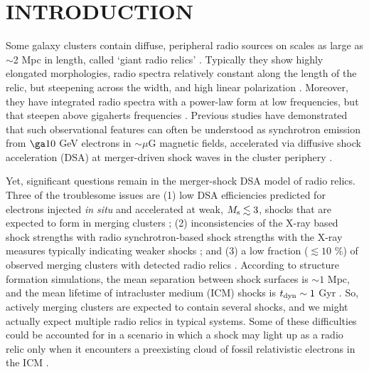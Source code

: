 \documentclass[twocolumn]{aastex61}
\begin{document}

\section{INTRODUCTION}

Some galaxy clusters contain diffuse, peripheral radio sources on scales as large as $\sim$2 Mpc in length, 
called `giant radio relics' \citep[see, e.g.,][for reviews]{feretti12,brug12, brunetti2014}. 
Typically they show highly elongated morphologies, radio spectra relatively constant along the length of the relic, 
but steepening across the width, and high linear polarization \citep{ensslin98, vanweeren10}.
Moreover, they have integrated radio spectra with a power-law form at low frequencies, but that steepen above gigaherts frequencies \citep{stroe16}. 
Previous studies have demonstrated that such observational features can often be understood as synchrotron emission 
from $\ga10$ GeV electrons in $\sim \mu$G magnetic fields, accelerated 
via diffusive shock acceleration (DSA) at merger-driven shock waves in the cluster periphery \citep[e.g.,][]{kang12}.

Yet, significant questions remain in the merger-shock DSA model of radio relics. Three of the troublesome issues are (1) low DSA efficiencies predicted for electrons injected {\it in situ} and accelerated at weak, $M_{\rm s}\lesssim 3$, shocks that are
expected to form in merging clusters \citep[e.g.,][]{ryu03, kang12}; (2) inconsistencies of the X-ray based shock 
strengths with radio synchrotron-based shock strengths with the X-ray measures typically indicating weaker shocks \citep[e.g.,][]{akamatsu13,ogrean14}; and
(3) a low fraction ($\lesssim 10$ \%) of observed merging clusters with detected radio relics \citep[e.g.,][]{ensslin01,kang16a}.
According to structure formation simulations, the mean separation 
between shock surfaces is $\sim 1$ Mpc, and the mean lifetime of intracluster medium (ICM) shocks is $t_{\rm dyn}\sim 1$ Gyr 
\citep[e.g.,][]{ryu03,pfrommer2006,skillman2008,vazza09}.
So, actively merging clusters are expected to contain several shocks, and we might actually expect multiple radio relics in typical systems. 
Some of these difficulties could be accounted for in
a scenario in which a shock may light up as a radio relic only when it 
encounters a preexisting cloud of fossil relativistic electrons in the ICM \citep[e.g.,][]{ensslin99,kangryu15}.
\end{document}
